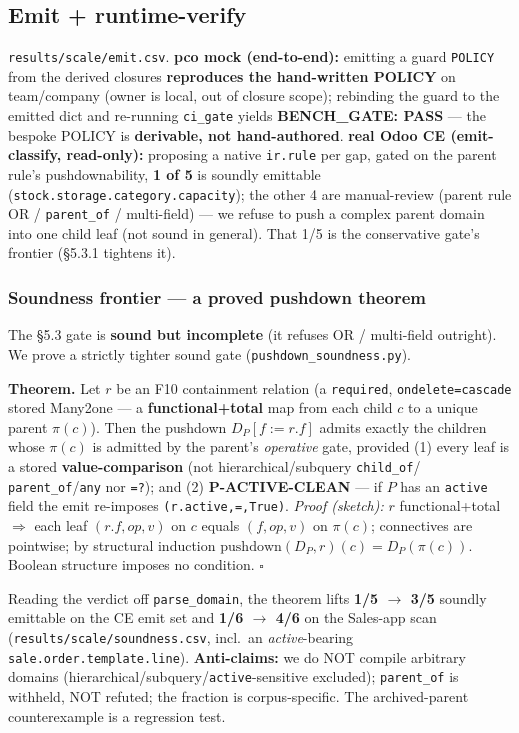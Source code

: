 \documentclass[runningheads]{llncs}
\newcommand{\code}[1]{\texttt{#1}}
\begin{document}
\subsection{Emit + runtime-verify}
\code{results/scale/emit.csv}. \textbf{pco mock (end-to-end):} emitting a guard \code{POLICY} from the derived
closures \textbf{reproduces the hand-written POLICY} on team/company (owner is local, out of closure scope);
rebinding the guard to the emitted dict and re-running \code{ci_gate} yields \textbf{BENCH\_GATE: PASS} --- the
bespoke POLICY is \textbf{derivable, not hand-authored}. \textbf{real Odoo CE (emit-classify, read-only):} proposing
a native \code{ir.rule} per gap, gated on the parent rule's pushdownability, \textbf{1 of 5} is soundly emittable
(\code{stock.storage.category.capacity}); the other 4 are manual-review (parent rule OR / \code{parent_of} /
multi-field) --- we refuse to push a complex parent domain into one child leaf (not sound in general). That 1/5 is
the conservative gate's frontier (\S5.3.1 tightens it).

\subsubsection{Soundness frontier --- a proved pushdown theorem}
The \S5.3 gate is \textbf{sound but incomplete} (it refuses OR / multi-field outright). We prove a strictly
tighter sound gate (\code{pushdown_soundness.py}).

\noindent\textbf{Theorem.} Let $r$ be an F10 containment relation (a \code{required}, \code{ondelete=cascade}
stored Many2one --- a \textbf{functional+total} map from each child $c$ to a unique parent $\pi(c)$). Then the
pushdown $D_P[f := r.f]$ admits exactly the children whose $\pi(c)$ is admitted by the parent's \emph{operative}
gate, provided (1) every leaf is a stored \textbf{value-comparison} (not hierarchical/subquery \code{child_of}/
\code{parent_of}/\code{any} nor \code{=?}); and (2) \textbf{P-ACTIVE-CLEAN} --- if $P$ has an \code{active} field
the emit re-imposes \code{(r.active,=,True)}. \emph{Proof (sketch):} $r$ functional+total $\Rightarrow$ each leaf
$(r.f,op,v)$ on $c$ equals $(f,op,v)$ on $\pi(c)$; connectives are pointwise; by structural induction
$\mathrm{pushdown}(D_P,r)(c)=D_P(\pi(c))$. Boolean structure imposes no condition. $\square$

Reading the verdict off \code{parse_domain}, the theorem lifts \textbf{1/5 $\to$ 3/5} soundly emittable on the CE
emit set and \textbf{1/6 $\to$ 4/6} on the Sales-app scan (\code{results/scale/soundness.csv}, incl.\ an
\emph{active}-bearing \code{sale.order.template.line}). \textbf{Anti-claims:} we do NOT compile arbitrary domains
(hierarchical/subquery/\code{active}-sensitive excluded); \code{parent_of} is withheld, NOT refuted; the fraction
is corpus-specific. The archived-parent counterexample is a regression test.
\end{document}
